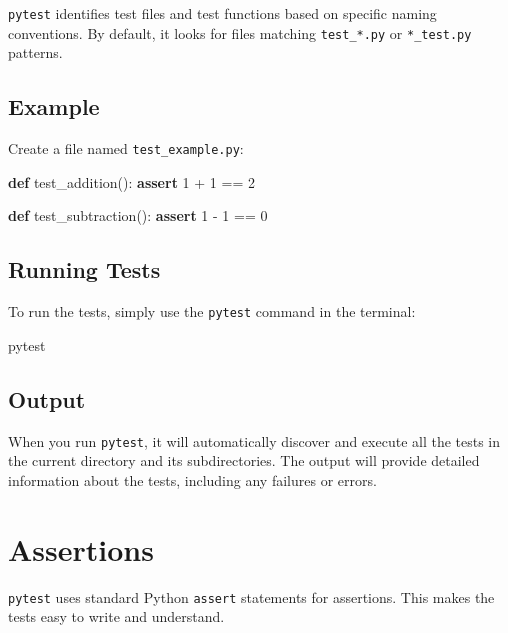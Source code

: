 \documentclass[
  letterpaper,
  DIV=11,
  numbers=noendperiod]{scrreprt}
\newenvironment{Shaded}{\begin{snugshade}}{\end{snugshade}}
\newcommand{\ControlFlowTok}[1]{\textcolor[rgb]{0.00,0.23,0.31}{\textbf{#1}}}
\newcommand{\DecValTok}[1]{\textcolor[rgb]{0.68,0.00,0.00}{#1}}
\newcommand{\ExtensionTok}[1]{\textcolor[rgb]{0.00,0.23,0.31}{#1}}
\newcommand{\KeywordTok}[1]{\textcolor[rgb]{0.00,0.23,0.31}{\textbf{#1}}}
\newcommand{\NormalTok}[1]{\textcolor[rgb]{0.00,0.23,0.31}{#1}}
\newcommand{\OperatorTok}[1]{\textcolor[rgb]{0.37,0.37,0.37}{#1}}
\begin{document}
\texttt{pytest} identifies test files and test functions based on
specific naming conventions. By default, it looks for files matching
\texttt{test\_*.py} or \texttt{*\_test.py} patterns.

\subsection{Example}\label{example-17}

Create a file named \texttt{test\_example.py}:

\begin{Shaded}
\begin{Highlighting}[]
\KeywordTok{def}\NormalTok{ test\_addition():}
    \ControlFlowTok{assert} \DecValTok{1} \OperatorTok{+} \DecValTok{1} \OperatorTok{==} \DecValTok{2}

\KeywordTok{def}\NormalTok{ test\_subtraction():}
    \ControlFlowTok{assert} \DecValTok{1} \OperatorTok{{-}} \DecValTok{1} \OperatorTok{==} \DecValTok{0}
\end{Highlighting}
\end{Shaded}

\subsection{Running Tests}\label{running-tests-2}

To run the tests, simply use the \texttt{pytest} command in the
terminal:

\begin{Shaded}
\begin{Highlighting}[]
\ExtensionTok{pytest}
\end{Highlighting}
\end{Shaded}

\subsection{Output}\label{output}

When you run \texttt{pytest}, it will automatically discover and execute
all the tests in the current directory and its subdirectories. The
output will provide detailed information about the tests, including any
failures or errors.

\section{Assertions}\label{assertions}

\texttt{pytest} uses standard Python \texttt{assert} statements for
assertions. This makes the tests easy to write and understand.
\end{document}
